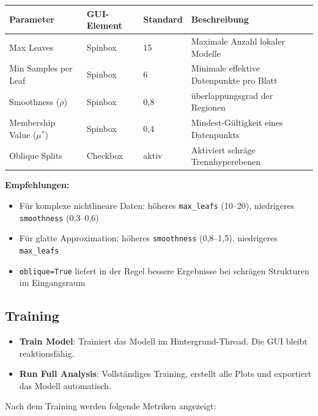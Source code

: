 \documentclass[11pt,a4paper]{report}
\begin{document}
	\begin{center}
		\begin{tabular}{p{3.5cm}p{2cm}p{1.5cm}p{5cm}}
			\toprule
			\textbf{Parameter} & \textbf{GUI-Element} & \textbf{Standard} & \textbf{Beschreibung} \\
			\midrule
			Max Leaves & Spinbox & 15 & Maximale Anzahl lokaler Modelle \\
			Min Samples per Leaf & Spinbox & 6 & Minimale effektive Datenpunkte pro Blatt \\
			Smoothness ($\rho$) & Spinbox & 0{,}8 & überlappungsgrad der Regionen \\
			Membership Value ($\mu^*$) & Spinbox & 0{,}4 & Mindest-Gültigkeit eines Datenpunkts \\
			Oblique Splits & Checkbox & aktiv & Aktiviert schräge Trennhyperebenen \\
			\bottomrule
		\end{tabular}
	\end{center}
	
	\textbf{Empfehlungen:}
	\begin{itemize}
		\item Für komplexe nichtlineare Daten: höheres \texttt{max\_leafs} (10--20), niedrigeres \texttt{smoothness} (0{,}3--0{,}6)
		\item Für glatte Approximation: höheres \texttt{smoothness} (0{,}8--1{,}5), niedrigeres \texttt{max\_leafs}
		\item \texttt{oblique=True} liefert in der Regel bessere Ergebnisse bei schrägen Strukturen im Eingangsraum
	\end{itemize}
	
	\subsection{Training}
	
	\begin{itemize}
		\item \textbf{Train Model}: Trainiert das Modell im Hintergrund-Thread. Die GUI bleibt reaktionsfähig.
		\item \textbf{Run Full Analysis}: Vollständiges Training, erstellt alle Plots und exportiert das Modell automatisch.
	\end{itemize}
	
	Nach dem Training werden folgende Metriken angezeigt:
	
\end{document}
